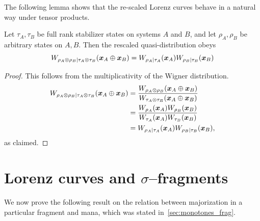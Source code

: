 \documentclass[pra,
aps,
twocolumn,
superscriptaddress,
groupedaddress,
nofootinbib,
reprint
]{revtex4-1}
\begin{document}
The following lemma shows that the re-scaled Lorenz curves behave in a natural way under tensor products. 
\begin{proposition}
	Let $\tau_A, \tau_B$ be full rank stabilizer states on systems $A$ and $B$, and let $\rho_A, \rho_B$ be arbitrary states on $A,B$. Then the rescaled quasi-distribution obeys
\begin{equation}
W_{\rho_A \otimes \rho_B | \tau_A \otimes \tau_B}(\bm{x}_A \oplus \bm{x}_B) =W_{\rho_A | \tau_A}(\boldsymbol{x}_A) W_{\rho_B | \tau_B}(\boldsymbol{x}_B)
\end{equation}
\end{proposition}
\begin{proof} This follows from the multiplicativity of the Wigner distribution. 
\begin{align}
W_{\rho_A \otimes \rho_B | \tau_A \otimes \tau_B}(\bm{x}_A \oplus \bm{x}_B) &= \frac{W_{\rho_A \otimes \rho_B} (\boldsymbol{x}_A \oplus \boldsymbol{x}_B)}{W_{\tau_A \otimes \tau_B} (\boldsymbol{x}_A \oplus \boldsymbol{x}_B)}\nonumber \\
 &= \frac{W_{\rho_A } (\boldsymbol{x}_A )W_{\rho_B } (\boldsymbol{x}_B )}{W_{\tau_A } (\boldsymbol{x}_A )W_{\tau_B } (\boldsymbol{x}_B )}\nonumber \\
  &= W_{\rho_A | \tau_A}(\boldsymbol{x}_A) W_{\rho_B | \tau_B}(\boldsymbol{x}_B)\nonumber,
\end{align}
as claimed.
\end{proof}


\section{Lorenz curves and $\sigma$--fragments}
\label{app:frag}

We now prove the following result on the relation between majorization in a particular fragment and mana, which was stated in~\cref{sec:monotones_frag}.
\end{document}
